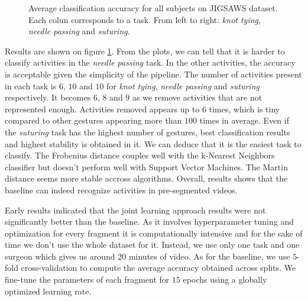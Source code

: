 \documentclass[twocolumn,10pt]{asme2ej}
\begin{document}
\begin{figure}[t]
\begin{subfigure}{0.25\paperwidth}
     \end{subfigure}
    \caption{Average classification accuracy for all subjects on JIGSAWS dataset. Each colun corresponds to a task. From left to right: \textit{knot tying}, \textit{needle passing} and \textit{suturing}.}
    \label{fig:eval-jigsaws-accuracy-baseline}
\end{figure}

Results are shown on figure \ref{fig:eval-jigsaws-accuracy-baseline}. From the plots, we can tell that it is harder to classify activities in the \textit{needle passing} task. In the other activities, the accuracy is acceptable given the simplicity of the pipeline. The number of activities present in each task is $6$, $10$ and $10$ for \textit{knot tying}, \textit{needle passing} and \textit{suturing} respectively. It becomes $6$, $8$ and $9$ as we remove activities that are not represented enough. Activities removed appears up to $6$ times, which is tiny compared to other gestures appearing more than $100$ times in average. Even if the \textit{suturing} task has the highest number of gestures, best classification results and highest stability is obtained in it. We can deduce that it is the easiest task to classify. The Frobenius distance couples well with the k-Nearest Neighbors classifier but doesn't perform well with Support Vector Machines. The Martin distance seems more stable accross algorithms. Overall, results shows that the baseline can indeed recognize activities in pre-segmented videos.

Early results indicated that the joint learning approach results were not significantly better than the baseline. As it involves hyperparameter tuning and optimization for every fragment it is computationally intensive and for the sake of time we don't use the whole dataset for it. Instead, we use only one task and one surgeon which gives us around $20$ minutes of video. As for the baseline, we use $5$-fold cross-validation to compute the average accuracy obtained across splits. We fine-tune the parameters of each fragment for $15$ epochs using a globally optimized learning rate.
\end{document}
